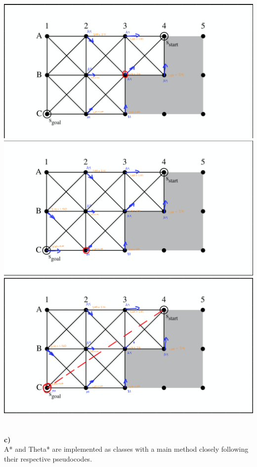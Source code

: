 \documentclass[12pt]{article}
\begin{document}
{\\
\includegraphics{s_grid_t_2.png}
\\
\includegraphics{s_grid_t_3.png}
\\
\includegraphics{s_grid_t_4.png}
\\
\\
\\
{\bf c)}
\\
A* and Theta* are implemented as classes with a main method closely following their respective pseudocodes.
}
\end{document}
